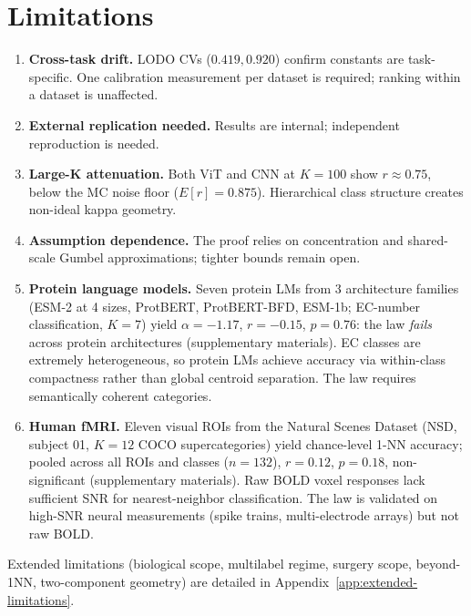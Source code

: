 \documentclass{article}
\begin{document}
\section{Limitations}
\label{sec:limitations}
\begin{enumerate}[nosep]
\item \textbf{Cross-task drift.} LODO CVs ($0.419, 0.920$) confirm constants are task-specific. One calibration measurement per dataset is required; ranking within a dataset is unaffected.
\item \textbf{External replication needed.} Results are internal; independent reproduction is needed.
\item \textbf{Large-K attenuation.} Both ViT and CNN at $K=100$ show $r\approx0.75$, below the MC noise floor ($E[r]=0.875$). Hierarchical class structure creates non-ideal kappa geometry.
\item \textbf{Assumption dependence.} The proof relies on concentration and shared-scale Gumbel approximations; tighter bounds remain open.
\item \textbf{Protein language models.} Seven protein LMs from 3 architecture families (ESM-2 at 4 sizes, ProtBERT, ProtBERT-BFD, ESM-1b; EC-number classification, $K=7$) yield $\alpha=-1.17$, $r=-0.15$, $p=0.76$: the law \emph{fails} across protein architectures (supplementary materials). EC classes are extremely heterogeneous, so protein LMs achieve accuracy via within-class compactness rather than global centroid separation. The law requires semantically coherent categories.
\item \textbf{Human fMRI.} Eleven visual ROIs from the Natural Scenes Dataset (NSD, subject 01, $K=12$ COCO supercategories) yield chance-level 1-NN accuracy; pooled across all ROIs and classes ($n=132$), $r=0.12$, $p=0.18$, non-significant (supplementary materials). Raw BOLD voxel responses lack sufficient SNR for nearest-neighbor classification. The law is validated on high-SNR neural measurements (spike trains, multi-electrode arrays) but not raw BOLD.
\end{enumerate}
Extended limitations (biological scope, multilabel regime, surgery scope, beyond-1NN, two-component geometry) are detailed in Appendix~\ref{app:extended-limitations}.
\end{document}
